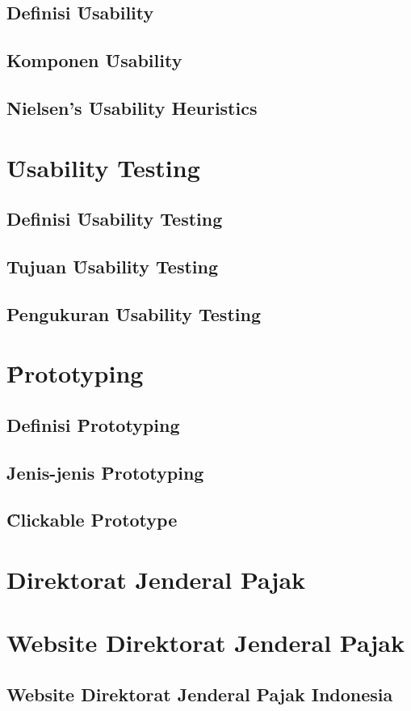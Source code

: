\subsection{Definisi \f{Usability}}
\subsection{Komponen \f{Usability}}
\subsection{Nielsen's \f{Usability Heuristics}}
\section{\f{Usability Testing}}
\subsection{Definisi \f{Usability Testing}}
\subsection{Tujuan \f{Usability Testing}}
\subsection{Pengukuran \f{Usability Testing}}
\section{\f{Prototyping}}
\subsection{Definisi \f{Prototyping}}
\subsection{Jenis-jenis \f{Prototyping}}
\subsection{\f{Clickable Prototype}}
\section{Direktorat Jenderal Pajak}
\section{Website Direktorat Jenderal Pajak}
\subsection{Website Direktorat Jenderal Pajak Indonesia}
